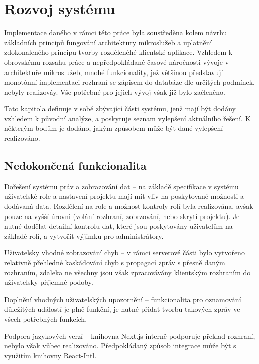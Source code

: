 \chapter{Rozvoj systému}\label{ch:improvements}


Implementace daného  v rámci této práce byla soustředěna kolem návrhu základních principů fungování architektury mikroslužeb a uplatnění zdokonaleného principu tvorby rozdělenéhé klientské aplikace.
Vzhledem k obrovskému rozsahu práce a nepředpokládané časové náročnosti vývoje v architektuře mikroslužeb, mnohé funkcionality, jež většinou představují monotónní implementaci  rozhraní se zápisem do databáze dle určitých podmínek, nebyly realizováy.
Vše potřebné pro jejich vývoj však již bylo začleněno.

Tato kapitola definuje v sobě zbývající části systému, jenž mají být dodány vzhledem k původní analýze, a poskytuje seznam vylepšení aktuálního řešení.
K některým bodům je dodáno, jakým způsobem může být dané vylepšení realizováno.

\newpage



\section{Nedokončená funkcionalita}\label{sec:unimplemented}

\begin{dl}
   \item[Dořešení systému práv a zobrazování dat] – na základě specifikace v systému uživatelské role a nastavení projektu mají mít vliv na poskytované možnosti a dodávaná data.
   Rozdělení na role a možnost kontroly rolí byla realizována, avšak pouze na vyšší úrovni (volání rozhraní, zobrzování, nebo skrytí projektu).
   Je nutné dodělat detailní kontrolu dat, které jsou poskytovány uživatelům na základě rolí, a vytvořit výjimku pro administrátory.
   \item[Uživatelsky vhodné zobrazování chyb] – v rámci serverové části bylo vytvořeno relativně přehledné kaskádování chyb s propagací zpráv s přesně daným rozhraním, zdaleka ne všechny jsou však zpracovávány klientským rozhraním do uživatelsky příjemné podoby.
   \item[Doplnění vhodných uživatelských upozornění] – funkcionalita pro oznamování důležitých událostí je plně funkční, je nutné přidat tvorbu takových zpráv ve všech potřebných funkcích.
   \item[Podpora jazykových verzí] – knihovna Next.js interně podporuje překlad rozhraní, nebylo však vůbec realizováno.
   Předpokládaný způsob integrace může být s využitím knihovny React-Intl.
\end{dl}

